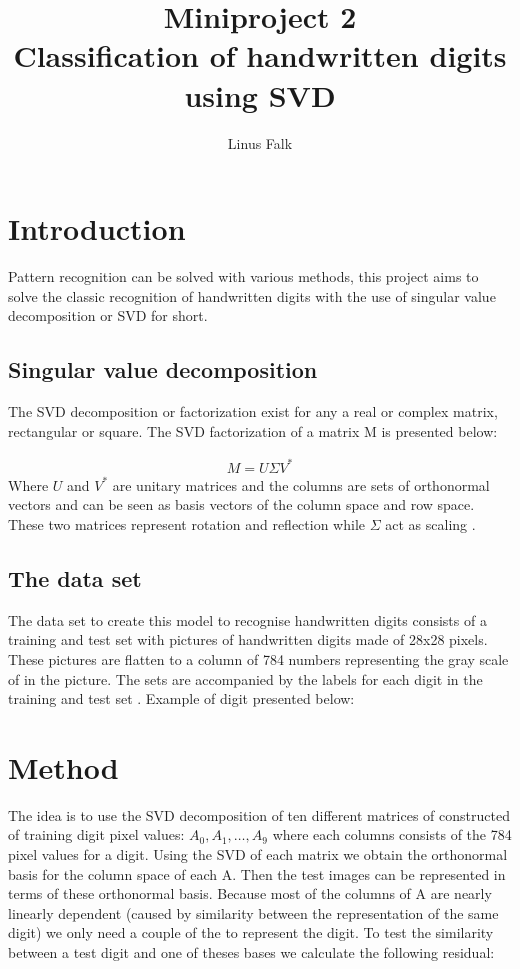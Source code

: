 \documentclass[a4paper]{article}
\title{Miniproject 2 \\ Classification of handwritten digits using SVD}
\author{Linus Falk}
\begin{document}
\maketitle
\section*{Introduction}
Pattern recognition can be solved with various methods, this project aims to solve the classic recognition of handwritten digits with the use of singular value decomposition or SVD for short. 

\subsection*{Singular value decomposition}
The SVD decomposition or factorization exist for any  a real or complex matrix, rectangular or square. The SVD factorization of a matrix M is presented below:

\begin{equation}
	\begin{aligned}
		M = U \Sigma V^{*}
	\end{aligned}
\end{equation}
Where $U$ and $V^{*}$ are unitary matrices and the columns are sets of orthonormal vectors and can be seen as basis vectors of the column space and row space. These two matrices represent rotation and reflection while $\Sigma$ act as scaling \citep{svd}.

\subsection*{The data set}
The data set to create this model to recognise handwritten digits consists of a training and test  set with pictures of handwritten digits made of 28x28 pixels. These pictures are flatten to a column of 784 numbers representing the gray scale of in the picture. The sets are accompanied by the labels for each digit in the training and test set \citep{notes} . Example of digit presented below:

\section*{Method}
The idea is to use the SVD decomposition of ten different matrices of constructed of training digit pixel values: $A_0,A_1,\ldots,A_{9}$ where each columns consists of the 784 pixel values for a digit. Using the SVD of each matrix we obtain the  orthonormal basis for the column space of each A. Then the test images can be represented in terms of these orthonormal basis. Because most of the columns of A are nearly linearly dependent (caused by similarity between the representation of the same digit) we only need a couple of the to represent the digit.
To test the similarity between a test digit and one of theses bases we calculate the following residual:
\end{document}
